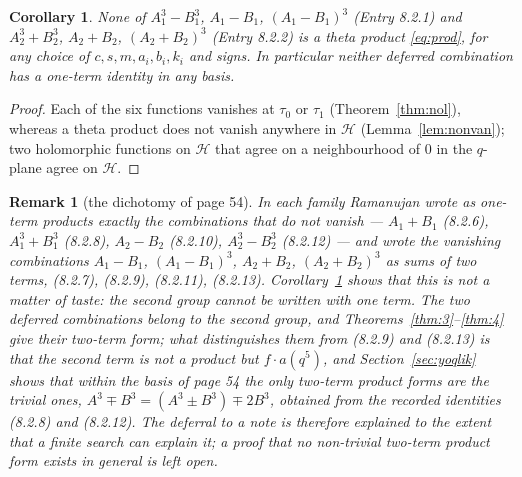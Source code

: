 \documentclass[pdflatex,sn-mathphys-num]{sn-jnl}
\theoremstyle{thmstyleone}%
\newtheorem{corollary}[theorem]{Corollary}%
\theoremstyle{thmstyletwo}%
\newtheorem{remark}{Remark}%
\newcommand{\f}{f}
\newcommand{\HH}{\mathcal{H}}
\begin{document}
\begin{corollary}\label{cor:nol}
None of $A_1^3-B_1^3$, $A_1-B_1$, $(A_1-B_1)^3$ (Entry 8.2.1) and $A_2^3+B_2^3$, $A_2+B_2$, $(A_2+B_2)^3$ (Entry 8.2.2) is a theta product \eqref{eq:prod}, for any choice of $c,s,m,a_i,b_i,k_i$ and signs. In particular neither deferred combination has a one-term identity in any basis.
\end{corollary}
\begin{proof}
Each of the six functions vanishes at $\tau_0$ or $\tau_1$ (Theorem~\ref{thm:nol}), whereas a theta product does not vanish anywhere in $\HH$ (Lemma~\ref{lem:nonvan}); two holomorphic functions on $\HH$ that agree on a neighbourhood of $0$ in the $q$-plane agree on $\HH$.
\end{proof}

\begin{remark}[the dichotomy of page 54]
In each family Ramanujan wrote as one-term products exactly the combinations that do not vanish --- $A_1+B_1$ (8.2.6), $A_1^3+B_1^3$ (8.2.8), $A_2-B_2$ (8.2.10), $A_2^3-B_2^3$ (8.2.12) --- and wrote the vanishing combinations $A_1-B_1$, $(A_1-B_1)^3$, $A_2+B_2$, $(A_2+B_2)^3$ as sums of two terms, (8.2.7), (8.2.9), (8.2.11), (8.2.13). Corollary~\ref{cor:nol} shows that this is not a matter of taste: the second group cannot be written with one term. The two deferred combinations belong to the second group, and Theorems~\ref{thm:3}--\ref{thm:4} give their two-term form; what distinguishes them from (8.2.9) and (8.2.13) is that the second term is not a product but $\f\cdot a(q^5)$, and Section~\ref{sec:yoqlik} shows that within the basis of page 54 the only two-term product forms are the trivial ones, $A^3\mp B^3=(A^3\pm B^3)\mp2B^3$, obtained from the recorded identities (8.2.8) and (8.2.12). The deferral to a note is therefore explained to the extent that a finite search can explain it; a proof that no non-trivial two-term product form exists in general is left open.
\end{remark}
\end{document}
